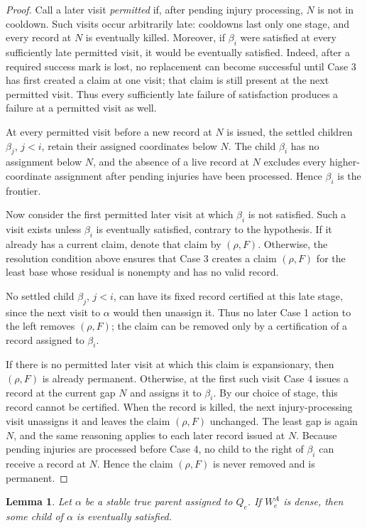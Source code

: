 \documentclass[10pt,a4paper]{amsart}
\newtheorem{lemma}[theorem]{Lemma}
\begin{document}
\begin{proof}
Call a later visit \emph{permitted} if, after pending injury processing,
$N$ is not in cooldown. Such visits occur arbitrarily late: cooldowns last
only one stage, and
every record at $N$ is eventually killed. Moreover, if $\beta_i$ were
satisfied at every sufficiently late permitted visit, it would be eventually
satisfied. Indeed, after a required success mark is lost, no replacement can
become successful until Case 3 has first created a claim at one visit; that
claim is still present at the next permitted visit. Thus every sufficiently
late failure of satisfaction produces a failure at a permitted visit as well.

At every permitted visit before a new record at $N$ is issued, the settled
children $\beta_j$, $j<i$, retain their assigned coordinates below $N$. The
child $\beta_i$ has no assignment below $N$, and the absence of a live record
at $N$ excludes every higher-coordinate assignment after pending injuries
have been processed. Hence $\beta_i$ is the frontier.

Now consider the first permitted later visit at which $\beta_i$ is not
satisfied. Such a visit exists unless $\beta_i$ is eventually satisfied,
contrary to the hypothesis. If it already has a current claim, denote that
claim by $(\rho,F)$. Otherwise, the resolution condition above ensures that
Case 3 creates a claim $(\rho,F)$ for the least base whose residual is
nonempty and has no valid record.

No settled child $\beta_j$, $j<i$, can have its fixed record certified at
this late stage, since the next visit to $\alpha$ would then unassign it.
Thus no later Case 1 action to the left removes $(\rho,F)$; the claim can be
removed only by a certification of a record assigned to $\beta_i$.

If there is no permitted later visit at which this claim is expansionary,
then $(\rho,F)$ is already permanent. Otherwise, at the first such visit
Case 4 issues a record at the current gap $N$ and assigns it to $\beta_i$.
By our choice of stage, this record cannot be certified. When the record is
killed, the next injury-processing visit unassigns it and leaves the claim
$(\rho,F)$ unchanged. The least gap is again $N$, and the same reasoning
applies to each later record issued at $N$. Because pending injuries are
processed before Case 4, no child to the right of $\beta_i$ can receive a
record at $N$. Hence the claim $(\rho,F)$ is never removed and is permanent.
\end{proof}


\begin{lemma}\label{low2:density}
Let $\alpha$ be a stable true parent assigned to $Q_e$. If $W_e^A$ is dense,
then some child of $\alpha$ is eventually satisfied.
\end{lemma}
\end{document}
